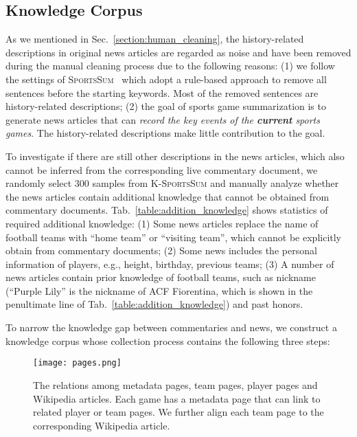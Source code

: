 \subsection{Knowledge Corpus}
\label{sec:knowledge_corpus}
As we mentioned in Sec.~\ref{section:human_cleaning}, the history-related descriptions in original news articles are regarded as noise and have been removed during the manual cleaning process due to the following reasons: (1) we follow the settings of \textsc{SportsSum}~\cite{Huang2020GeneratingSN} which adopt a rule-based approach to remove all sentences before the starting keywords. Most of the removed sentences are history-related descriptions; (2) the goal of sports game summarization is to generate news articles that can \emph{record the key events of the \textbf{current} sports games}. The history-related descriptions make little contribution to the goal.

To investigate if there are still other descriptions in the news articles, which also cannot be inferred from the corresponding live commentary document, we randomly select 300 samples from \textsc{K-SportsSum} and manually analyze whether the news articles contain additional knowledge that cannot be obtained from commentary documents. Tab.~\ref{table:addition_knowledge} shows statistics of required additional knowledge: (1) Some news articles replace the name of football teams with ``home team'' or ``visiting team'', which cannot be explicitly obtain from commentary documents; (2) Some news includes the personal information of players, e.g., height, birthday, previous teams; (3) A number of news articles contain prior knowledge of football teams, such as nickname (``Purple Lily'' is the nickname of ACF Fiorentina, which is shown in the penultimate line of Tab.~\ref{table:addition_knowledge}) and past honors.

To narrow the knowledge gap between commentaries and news, we construct a knowledge corpus whose collection process contains the following three steps:

\begin{figure}[t]
\centering
\setlength{\belowcaptionskip}{-10pt}
\centerline{\texttt{[image: pages.png]}}
\caption{The relations among metadata pages, team pages, player pages and Wikipedia articles. Each game has a metadata page that can link to related player or team pages. We further align each team page to the corresponding Wikipedia article.}
\label{fig:pages}
\end{figure}

